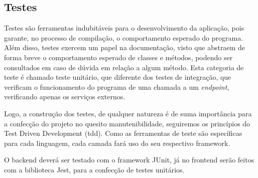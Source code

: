 
\subsection{Testes}
Testes são ferramentas indubitáveis para o desenvolvimento da aplicação, pois garante, no processo de compilação, o comportamento esperado do programa. Além disso, testes exercem um papel na documentação, visto que abstraem de forma breve o comportamento esperado de classes e métodos,
podendo ser consultados em caso de dúvida em relação a algum método. Esta categoria de teste é chamado teste unitário, que diferente dos testes de integração, que verificam o funcionamento do programa de uma chamada a um \emph{endpoint}, verificando apenas os serviços externos.

Logo, a construção dos testes, de qualquer natureza é de suma importância para a confecção do projeto no quesito manutenibilidade, seguiremos os princípios do Test Driven Development (\gls{tdd}). Como as ferramentas de teste são específicas para cada linguagem, cada camada fará uso do seu respectivo \gls{framework}.

O \gls{backend} deverá ser testado com o \gls{framework} JUnit, já no \gls{frontend} serão feitos com a biblioteca Jest, para a confecção de testes unitários.
